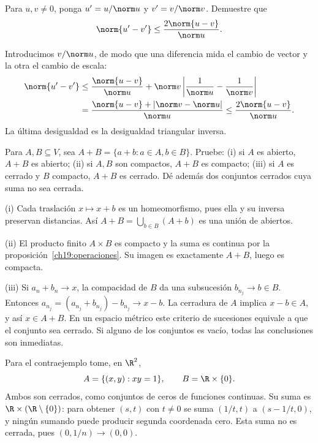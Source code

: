 \begin{ejercicio}
Para $u,v\ne0$, ponga $u'=u/\norm u$ y $v'=v/\norm v$. Demuestre que
\[\norm{u'-v'}\leq\frac{2\norm{u-v}}{\norm u}.\]
\end{ejercicio}
\begin{solucion}
Introducimos $v/\norm u$, de modo que una diferencia mida el cambio de vector y la otra el cambio de escala:
\begin{align*}
 \norm{u'-v'}
 &\leq\frac{\norm{u-v}}{\norm u}
 +\norm v\left|\frac1{\norm u}-\frac1{\norm v}\right|\\
 &=\frac{\norm{u-v}+|\norm v-\norm u|}{\norm u}
 \leq\frac{2\norm{u-v}}{\norm u}.
\end{align*}
La última desigualdad es la desigualdad triangular inversa.
\end{solucion}

\begin{ejercicio}
Para $A,B\subseteq V$, sea $A+B=\{a+b:a\in A,b\in B\}$. Pruebe: (i) si $A$ es abierto, $A+B$ es abierto; (ii) si $A,B$ son compactos, $A+B$ es compacto; (iii) si $A$ es cerrado y $B$ compacto, $A+B$ es cerrado. Dé además dos conjuntos cerrados cuya suma no sea cerrada.
\end{ejercicio}
\begin{solucion}
(i) Cada traslación $x\mapsto x+b$ es un homeomorfismo, pues ella y su inversa preservan distancias. Así $A+B=\bigcup_{b\in B}(A+b)$ es una unión de abiertos.

(ii) El producto finito $A\times B$ es compacto y la suma es continua por la proposición~\ref{ch19:operaciones}. Su imagen es exactamente $A+B$, luego es compacta.

(iii) Si $a_n+b_n\to x$, la compacidad de $B$ da una subsucesión $b_{n_j}\to b\in B$. Entonces $a_{n_j}=(a_{n_j}+b_{n_j})-b_{n_j}\to x-b$. La cerradura de $A$ implica $x-b\in A$, y así $x\in A+B$. En un espacio métrico este criterio de sucesiones equivale a que el conjunto sea cerrado. Si alguno de los conjuntos es vacío, todas las conclusiones son inmediatas.

Para el contraejemplo tome, en $\R^2$,
\[
 A=\{(x,y):xy=1\},\qquad B=\R\times\{0\}.
\]
Ambos son cerrados, como conjuntos de ceros de funciones continuas. Su suma es $\R\times(\R\setminus\{0\})$: para obtener $(s,t)$ con $t\ne0$ se suma $(1/t,t)$ a $(s-1/t,0)$, y ningún sumando puede producir segunda coordenada cero. Esta suma no es cerrada, pues $(0,1/n)\to(0,0)$.
\end{solucion}

